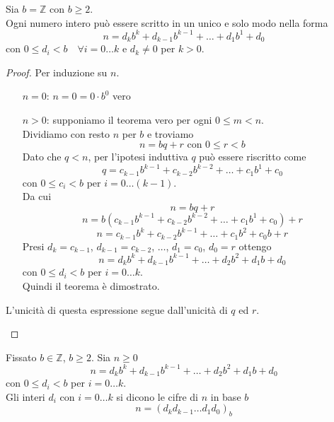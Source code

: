 \documentclass[a4paper,12pt, oneside]{book}
\begin{document}
\begin{teorema}
	Sia $b = \mathbb{Z}$ con $b \geq 2$.\\
	Ogni numero intero può essere scritto in un unico e solo modo nella forma
	$$n = d_{k}b^{k} + d_{k-1}b^{k-1} + \dots + d_{1}b^{1} + d_{0}$$
	con $0 \leq d_i < b \quad \forall  i = 0 \dots k$ e $d_k \not = 0$ per $k>0$.

	\begin{proof}
		Per induzione su $n$.
		\begin{itemize}
			\item [$n = 0$:] $n = 0 = 0 \cdot b^0$ vero
			\item [$n > 0$:] supponiamo il teorema vero per ogni $0 \leq m < n$.\\
			      Dividiamo con resto $n$ per $b$ e troviamo
			      $$n = bq + r \mbox{ con } 0 \leq r < b$$
			      Dato che $q < n$, per l'ipotesi induttiva $q$ può essere riscritto come
			      $$q = c_{k-1}b^{k-1} + c_{k-2}b^{k-2} + \dots + c_{1}b^{1} + c_{0}$$
			      con $0 \leq c_i < b$ per $i = 0 \dots (k-1)$.\\
			      Da cui
			      $$n = bq + r$$
			      $$n = b(c_{k-1}b^{k-1} + c_{k-2}b^{k-2} + \dots + c_{1}b^{1} + c_{0}) +r$$
			      $$n = c_{k-1}b^{k} + c_{k-2}b^{k-1} + \dots + c_{1}b^{2} + c_{0}b + r$$
			      Presi $d_{k} = c_{k-1}$, $d_{k-1} = c_{k-2}$, $\dots$, $d_{1} = c_{0}$, $d_{0} = r$ ottengo
			      $$n = d_{k}b^{k} + d_{k-1}b^{k-1} + \dots + d_{2}b^{2} + d_{1}b + d_0$$
			      con $0 \leq d_i < b$ per $i = 0 \dots k$.\\
			      Quindi il teorema è dimostrato.
		\end{itemize}

		\begin{nota}
			L'unicità di questa espressione segue dall'unicità di $q$ ed $r$.
		\end{nota}

	\end{proof}
\end{teorema}
\begin{definizione}
	Fissato $b \in \mathbb{Z}$, $b \geq 2$. Sia $n \geq 0$
	$$n = d_{k}b^{k} + d_{k-1}b^{k-1} + \dots + d_{2}b^{2} + d_{1}b + d_0$$
	con $0 \leq d_i < b$ per $i = 0 \dots k$.\\
	Gli interi $d_i$ con $i = 0 \dots k$ si dicono le cifre di $n$ in base $b$
	$$n = (d_k d_{k-1} \dots d_1 d_0)_b$$
\end{definizione}
\end{document}
